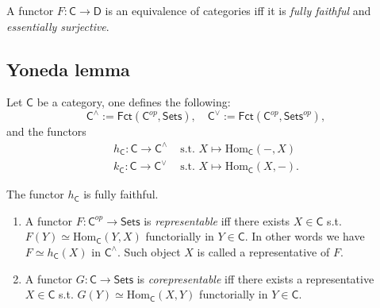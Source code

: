 \begin{prop}
	A functor $F: \mathsf{C} \to \mathsf{D}$ is an equivalence of categories iff it is {\em fully faithful} and {\em essentially surjective}.
\end{prop} 

\subsection{Yoneda lemma}

\begin{defn}[]
	Let $\mathsf{C}$ be a category, one defines the following:
	\begin{equation}
	\mathsf{C}^\wedge := \mathsf{Fct}\left(\mathsf{C}^{op}, \mathsf{Sets} \right), \quad \mathsf{C}^\vee := \mathsf{Fct}\left(\mathsf{C}^{op}, \mathsf{Sets}^{op} \right)
	,\end{equation} 
	and the functors
	\begin{align}
		h_\mathsf{C}: \mathsf{C} \to \mathsf{C}^\wedge &\text{ s.t. }
		X \mapsto \mathrm{Hom}_{\mathsf{\mathsf{C}}} \left( -, X \right)\\
		k_\mathsf{C}: \mathsf{C} \to \mathsf{C}^\vee &\text{ s.t. }
		X \mapsto \mathrm{Hom}_{\mathsf{\mathsf{C}}} \left( X, - \right)
	.\end{align}
\end{defn}

\begin{lem}[Yoneda]
	The functor $h_\mathsf{C}$ is fully faithful.
\end{lem} 

\begin{defn}\leavevmode\vspace{-\baselineskip}
	\begin{enumerate}
		\item A functor $F: \mathsf{C}^{op} \to \mathsf{Sets}$ is {\em representable} iff there exists $X \in \mathsf{C}$ s.t. $F(Y) \simeq \mathrm{Hom}_{\mathsf{C}} \left( Y, X \right)$ functorially in $Y \in \mathsf{C}$.
			In other words we have $F \simeq h_\mathsf{C}(X)$ in $\mathsf{C}^{\wedge}$. 
			Such object $X$ is called a representative of $F$.
		\item A functor $G: \mathsf{C} \to \mathsf{Sets}$ is {\em corepresentable} iff there exists a representative $X \in \mathsf{C}$ s.t. $G(Y) \simeq \mathrm{Hom}_{\mathsf{C}} \left( X, Y \right)$ functorially in $Y \in \mathsf{C}$.
	\end{enumerate} 
\end{defn}

